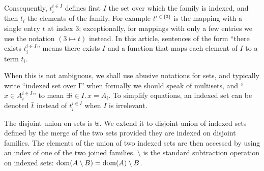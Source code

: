 \documentclass{lmcs}
\begin{document}
Consequently, $t_i^{i\in I}$ defines first $I$ the set over which the
family is indexed, and then $t_i$ the elements of the family.
For example $t^{i\in\{3\}}$ is
the mapping with a single entry $t$ at index $3$; exceptionally, for mappings with
only a few entries we use the notation $(3\mapsto t)$ instead.
In this article, sentences of the form ``there exists $t_i^{i\in I}$'' means there exists $I$ and a function that maps each element of $I$ to a term $t_i$.

When this is not ambiguous, we shall use abusive notations 
for sets, and typically write ``indexed set over I'' when  
formally we should speak of multisets, and ``$x\in
A_i^{i\in I}$'' to mean $\exists i\in I.\, x=A_i$.
To simplify equations, an indexed set can be denoted $\overline{t}$
instead of $t_i^{i\in I}$ when $I$ is irrelevant.

The disjoint union on sets is $\uplus$. We extend it to  disjoint union  of indexed 
sets defined by the merge of the 
two sets provided they are indexed on disjoint families.
The elements
of the union of two indexed sets are then accessed by using an index of one of the two
joined families.
$\setminus$ is the standard subtraction operation on indexed sets: $\operatorname{dom}(A\setminus B)=\operatorname{dom}(A)\setminus B$.

\end{document}
